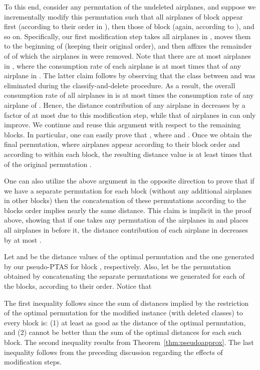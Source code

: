 \documentclass[11pt]{article}
\theoremstyle{plain}
\theoremstyle{definition}
\begin{document}
To this end, consider any permutation  of the undeleted airplanes, and suppose we incrementally modify this permutation such that all airplanes of block  appear first (according to their order in ), then those of block  (again, according to ), and so on. Specifically, our first modification step takes all airplanes in , moves them to the beginning of  (keeping their original order), and then affixes the remainder of  of which the airplanes in  were removed. Note that there are at most  airplanes in , where the consumption rate of each airplane is at most  times that of any airplane in . The latter claim follows by observing that the class between  and  was eliminated during the classify-and-delete procedure. As a result, the overall consumption rate of all airplanes in  is at most  times the consumption rate of any airplane of . Hence, the distance contribution of any airplane in  decreases by a factor of at most  due to this modification step, while that of airplanes in  can only improve. We continue and reuse this argument with respect to the remaining blocks. In particular, one can easily prove that , where  and . Once we obtain the final permutation, where airplanes appear according to their block order and according to  within each block, the resulting distance value is at least  times that of the original permutation .

One can also utilize the above argument in the opposite direction to prove that if we have a separate permutation for each block (without any additional airplanes in other blocks) then the concatenation of these permutations according to the blocks order  implies nearly the same distance. This claim is implicit in the proof above, showing that if one takes any permutation of the airplanes in  and places all airplanes in  before it, the distance contribution of each airplane in  decreases by at most .

\smallskip {} Let  and  be the distance values of the  optimal permutation and the one generated by our pseudo-PTAS for block , respectively. Also, let  be the permutation obtained by concatenating the separate permutations we generated for each of the blocks, according to their order. Notice that

The first inequality follows since the sum of distances implied by the restriction of the optimal permutation for the modified instance (with deleted classes) to every block  is: (1) at least as good as the distance of the optimal permutation, and (2) cannot be better than the sum of the optimal distances for each such block. The second inequality results from Theorem~\ref{thm:pseudoapprox}. The last inequality follows from the preceding discussion regarding the effects of modification steps.
\end{document}
